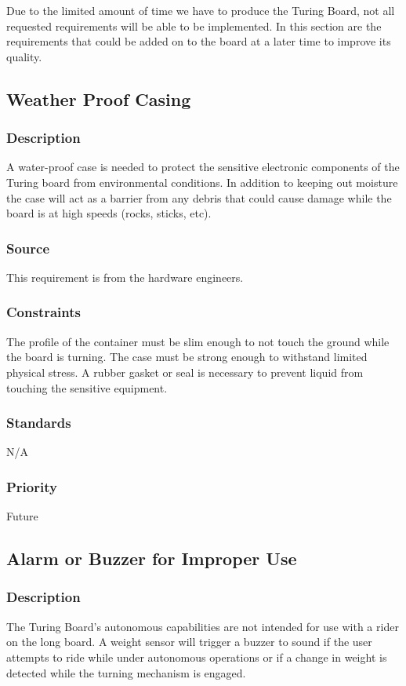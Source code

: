 Due to the limited amount of time we have to produce the Turing Board, not all requested requirements will be able to be implemented. In this section are the requirements that could be added on to the board at a later time to improve its quality.

\subsection{Weather Proof Casing}
\subsubsection{Description}
A water-proof case is needed to protect the sensitive electronic components of the Turing board from environmental conditions. In addition to keeping out moisture the case will act as a barrier from any debris that could cause damage while the board is at high speeds (rocks, sticks, etc).
\subsubsection{Source}
This requirement is from the hardware engineers.
\subsubsection{Constraints}
The profile of the container must be slim enough to not touch the ground while the board is turning. The case must be strong enough to withstand limited physical stress. A rubber gasket or seal is necessary to prevent liquid from touching the sensitive equipment.
\subsubsection{Standards}
N/A
\subsubsection{Priority}
Future

\subsection{Alarm or Buzzer for Improper Use}
\subsubsection{Description}
The Turing Board's autonomous capabilities are not intended for use with a rider on the long board. A weight sensor will trigger a buzzer to sound if the user attempts to ride while under autonomous operations or if a change in weight is detected while the turning mechanism is engaged.
